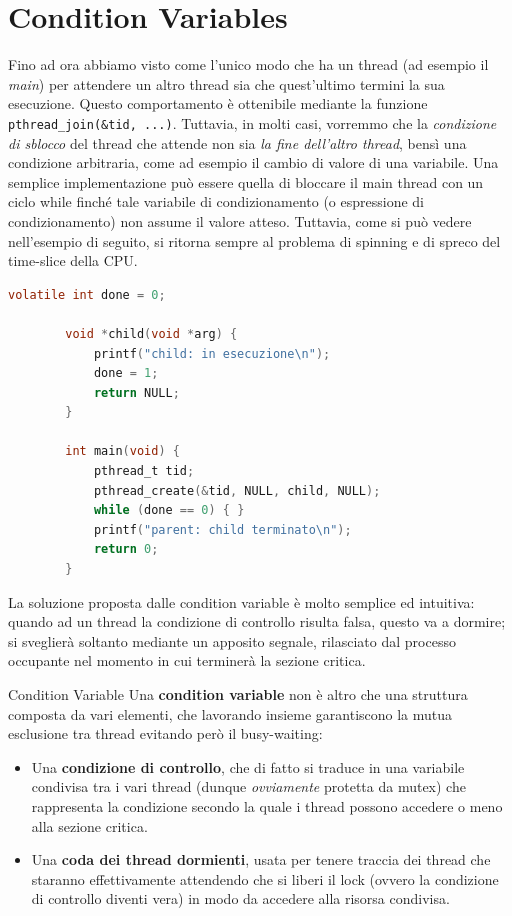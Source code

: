 \documentclass[12pt]{report}
\begin{document}
	\section{Condition Variables}
	Fino ad ora abbiamo visto come l'unico modo che ha un thread (ad esempio il \textit{main}) per attendere un altro thread sia che quest'ultimo termini la sua esecuzione. Questo comportamento è ottenibile mediante la funzione \texttt{pthread\_join(\&tid, ...)}. Tuttavia, in molti casi, vorremmo che la \textit{condizione di sblocco} del thread che attende non sia \textit{la fine dell'altro thread}, bensì una condizione arbitraria, come ad esempio il cambio di valore di una variabile. Una semplice implementazione può essere quella di bloccare il main thread con un ciclo while finché tale variabile di condizionamento (o espressione di condizionamento) non assume il valore atteso. Tuttavia, come si può vedere nell'esempio di seguito, si ritorna sempre al problema di spinning e di spreco del time-slice della CPU.
	\begin{lstlisting}[language=C]
		volatile int done = 0;
		
		void *child(void *arg) {
			printf("child: in esecuzione\n");
			done = 1;
			return NULL;
		}
		
		int main(void) {
			pthread_t tid;
			pthread_create(&tid, NULL, child, NULL);
			while (done == 0) { }
			printf("parent: child terminato\n");
			return 0;
		}
	\end{lstlisting}
	La soluzione proposta dalle condition variable è molto semplice ed intuitiva: quando ad un thread la condizione di controllo risulta falsa, questo va a dormire; si sveglierà soltanto mediante un apposito segnale, rilasciato dal processo occupante nel momento in cui terminerà la sezione critica.
	\begin{definizione}{Condition Variable}{}
		Una \textbf{condition variable} non è altro che una struttura composta da vari elementi, che lavorando insieme garantiscono la mutua esclusione tra thread evitando però il busy-waiting:
		\begin{itemize}
			\item Una \textbf{condizione di controllo}, che di fatto si traduce in una variabile condivisa tra i vari thread (dunque \textit{ovviamente} protetta da mutex) che rappresenta la condizione secondo la quale i thread possono accedere o meno alla sezione critica.
			
			\item Una \textbf{coda dei thread dormienti}, usata per tenere traccia dei thread che staranno effettivamente attendendo che si liberi il lock (ovvero la condizione di controllo diventi vera) in modo da accedere alla risorsa condivisa.
		\end{itemize}
	\end{definizione}
	
\end{document}
